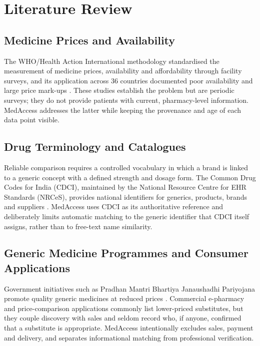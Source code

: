 \documentclass[11pt,a4paper]{article}
\begin{document}
\section{Literature Review}\label{ch:lit}

\subsection{Medicine Prices and Availability}
The WHO/Health Action International methodology \cite{who2008} standardised the measurement of medicine prices, availability and affordability through facility surveys, and its application across 36 countries documented poor availability and large price mark-ups \cite{cameron2009}. These studies establish the problem but are periodic surveys; they do not provide patients with current, pharmacy-level information. MedAccess addresses the latter while keeping the provenance and age of each data point visible.

\subsection{Drug Terminology and Catalogues}
Reliable comparison requires a controlled vocabulary in which a brand is linked to a generic concept with a defined strength and dosage form. The Common Drug Codes for India (CDCI), maintained by the National Resource Centre for EHR Standards (NRCeS), provides national identifiers for generics, products, brands and suppliers \cite{cdci}. MedAccess uses CDCI as its authoritative reference and deliberately limits automatic matching to the generic identifier that CDCI itself assigns, rather than to free-text name similarity.

\subsection{Generic Medicine Programmes and Consumer Applications}
Government initiatives such as Pradhan Mantri Bhartiya Janaushadhi Pariyojana promote quality generic medicines at reduced prices \cite{pmbjp}. Commercial e-pharmacy and price-comparison applications commonly list lower-priced substitutes, but they couple discovery with sales and seldom record who, if anyone, confirmed that a substitute is appropriate. MedAccess intentionally excludes sales, payment and delivery, and separates informational matching from professional verification.
\end{document}
